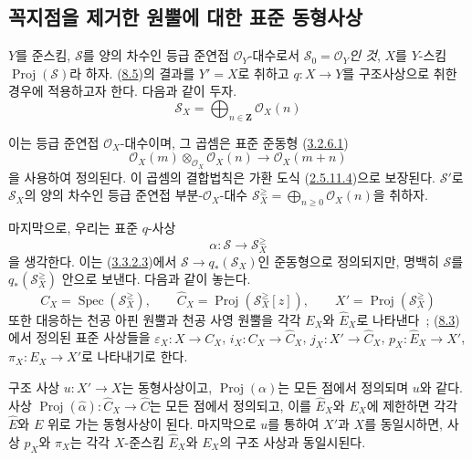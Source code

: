\subsection{꼭지점을 제거한 원뿔에 대한 표준 동형사상}
\label{subsection:II.8.6-ko}

\begin{env}[8.6.1]
\label{II.8.6.1-ko}
$Y$를 준스킴, $\mathcal{S}$를 양의 차수인 등급 준연접
$\mathcal{O}_Y$-대수로서
\emph{$\mathcal{S}_0=\mathcal{O}_Y$인 것}, $X$를 $Y$-스킴
$\operatorname{Proj}(\mathcal{S})$라 하자.
(\hyperref[subsection:II.8.5-ko]{8.5})의 결과를 $Y'=X$로 취하고
$q:X\to Y$를 구조사상으로 취한 경우에 적용하고자 한다. 다음과 같이
두자.
\begin{equation}
\label{II.8.6.1.1-ko}
  \mathcal{S}_X=\bigoplus_{n\in\mathbf{Z}}\mathcal{O}_X(n)
\tag{8.6.1.1}
\end{equation}

이는 등급 준연접 $\mathcal{O}_X$-대수이며, 그 곱셈은 표준 준동형
(\hyperref[II.3.2.6.1-ko]{3.2.6.1})
\[
  \mathcal{O}_X(m)\otimes_{\mathcal{O}_X}\mathcal{O}_X(n)
  \to\mathcal{O}_X(m+n)
\]
을 사용하여 정의된다. 이 곱셈의 결합법칙은 가환 도식
(\hyperref[II.2.5.11.4-ko]{2.5.11.4})으로 보장된다.
$\mathcal{S}'$로 $\mathcal{S}_X$의 양의 차수인 등급 준연접
부분-$\mathcal{O}_X$-대수
$\mathcal{S}_X^{\geq}=\bigoplus_{n\geq0}\mathcal{O}_X(n)$을 취하자.

마지막으로, 우리는 표준 $q$-사상
\begin{equation}
\label{II.8.6.1.2-ko}
  \alpha:\mathcal{S}\to\mathcal{S}_X^{\geq}
\tag{8.6.1.2}
\end{equation}
을 생각한다. 이는 (\hyperref[II.3.3.2.3-ko]{3.3.2.3})에서
$\mathcal{S}\to q_*(\mathcal{S}_X)$인 준동형으로 정의되지만, 명백히 $\mathcal{S}$를
$q_*(\mathcal{S}_X^{\geq})$ 안으로 보낸다. 다음과 같이 놓는다.
\begin{equation}
\label{II.8.6.1.3-ko}
  C_X=\operatorname{Spec}(\mathcal{S}_X^{\geq}),\qquad
  \widehat{C}_X=\operatorname{Proj}(\mathcal{S}_X^{\geq}[z]),\qquad
  X'=\operatorname{Proj}(\mathcal{S}_X^{\geq})
\tag{8.6.1.3}
\end{equation}
또한 대응하는 천공 아핀 원뿔과 천공 사영 원뿔을 각각 $E_X$와
$\widehat{E}_X$로 나타낸다~; (\hyperref[subsection:II.8.3-ko]{8.3})에서
정의된 표준 사상들을
$\varepsilon_X:X\to C_X$, $i_X:C_X\to\widehat{C}_X$,
$j_X:X'\to\widehat{C}_X$, $p_X:\widehat{E}_X\to X'$,
$\pi_X:E_X\to X'$로 나타내기로 한다.
\end{env}

\begin{proposition}[8.6.2]
\label{II.8.6.2-ko}
구조 사상 $u:X'\to X$는 동형사상이고,
$\operatorname{Proj}(\alpha)$는 모든 점에서 정의되며 $u$와 같다.
사상
$\operatorname{Proj}(\widehat{\alpha}):\widehat{C}_X\to\widehat{C}$는
모든 점에서 정의되고, 이를 $\widehat{E}_X$와 $E_X$에 제한하면 각각
$\widehat{E}$와 $E$ 위로 가는 동형사상이 된다. 마지막으로 $u$를
통하여 $X'$과 $X$를 동일시하면, 사상 $p_X$와 $\pi_X$는 각각
$X$-준스킴 $\widehat{E}_X$와 $E_X$의 구조 사상과 동일시된다.
\end{proposition}

